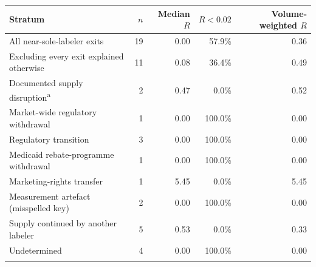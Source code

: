 \begin{tabular}{@{}lrrrr@{}}
\toprule
Stratum & $n$ & Median $R$ & $R<0.02$ & Volume-weighted $R$ \\
\midrule
All near-sole-labeler exits & 19 & 0.00 & 57.9\% & 0.36 \\
Excluding every exit explained otherwise & 11 & 0.08 & 36.4\% & 0.49 \\
\midrule
Documented supply disruption\textsuperscript{a} & 2 & 0.47 & 0.0\% & 0.52 \\
Market-wide regulatory withdrawal & 1 & 0.00 & 100.0\% & 0.00 \\
Regulatory transition & 3 & 0.00 & 100.0\% & 0.00 \\
Medicaid rebate-programme withdrawal & 1 & 0.00 & 100.0\% & 0.00 \\
Marketing-rights transfer & 1 & 5.45 & 0.0\% & 5.45 \\
Measurement artefact (misspelled key) & 2 & 0.00 & 100.0\% & 0.00 \\
\midrule
Supply continued by another labeler & 5 & 0.53 & 0.0\% & 0.33 \\
Undetermined & 4 & 0.00 & 100.0\% & 0.00 \\
\botrule
\end{tabular}

